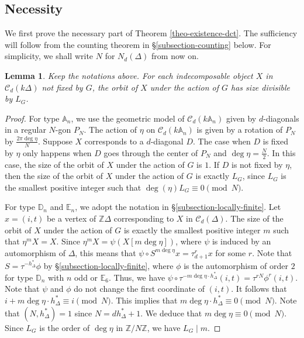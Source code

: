 \documentclass[12pt]{article}
\theoremstyle{plain}
\newtheorem{Lem}[Def]{Lemma}
\theoremstyle{definition}
\begin{document}
\subsection{Necessity}\label{subsection-necessarity}
We first prove the necessary part of Theorem \ref{theo-existence-dct}.  The
sufficiency will follow from the counting theorem in \S\ref{subsection-counting} below.  For simplicity, we shall write $N$ for $N_d(\Delta)$ from now on. 

\begin{Lem}\label{lem-LG1}
Keep the notations above.  For each indecomposable object \(X\) in
\(\mathcal{C}_d(k\Delta)\) not fixed by \(G\), the orbit of \(X\) under the
action of \(G\) has size divisible by \(L_G\). 
\end{Lem}
\begin{proof}
For type $\mathbb{A}_n$, we use the geometric model of
\(\mathcal{C}_d(k\mathbb{A}_n)\) given by \(d\)-diagonals in a regular
\(N\)-gon \(P_N\). The action of \(\eta\) on
\(\mathcal{C}_d(k\mathbb{A}_n)\) is given by a rotation of \(P_N\) by
\(\frac{2\pi\deg\eta}{N}\). Suppose \(X\) corresponds to a \(d\)-diagonal
\(D\).  The case when \(D\) is fixed by \(\eta\) only happens when \(D\) goes
through the center of \(P_N\) and \(\deg\eta=\frac{N}{2}\). In this case, the
size of the orbit of \(X\) under the action of \(G\) is \(1\). If \(D\) is not
fixed by \(\eta\), then the size of the orbit of \(X\) under the action of
\(G\) is exactly \(L_G\), since \(L_G\) is the smallest positive integer such
that \(\deg(\eta)L_G\equiv0\pmod N\).

For type $\mathbb{D}_n$ and $\mathbb{E}_n$, we adopt the notation in \S \ref{subsection-locally-finite}.
Let $x=(i,t)$ be a vertex of $\mathbb{Z}\Delta$ corresponding to $X$ in $\mathcal{C}_d(\Delta)$. The size of the orbit of $X$ under the action of $G$ is exactly the smallest positive integer $m$ such that $\eta^m X = X$. Since $\eta^m X = \psi (X[m\deg\eta])$, where $\psi$ is induced by an automorphism of $\Delta$, this means that $\psi \circ S^{m\deg\eta} x=\tau_{d+1}^r x$ for some $r$. 
Note that  $S=\tau^{-h_{\Delta}^*}\phi$ by \S \ref{subsection-locally-finite}, where $\phi$ is the automorphism of order $2$ for type $\mathbb{D}_n$ with $n$ odd or $\mathbb{E}_6$. Thus, we have 
\(\psi\circ \tau^{-m\deg\eta\cdot h_{\Delta}^*}(i,t)=\tau^{rN}\phi^r(i,t).\)
Note that $\psi$ and $\phi$ do not change the first coordinate of $(i,t)$. It follows that 
\(i+m\deg\eta \cdot h_{\Delta}^* \equiv i \pmod{N}.\)
This implies that $m\deg\eta \cdot h_{\Delta}^* \equiv 0 \pmod{N}$. Note that $(N,h_{\Delta}^*)=1$ since $N=dh_{\Delta}^*+1$. We deduce that $m\deg\eta \equiv 0 \pmod{N}$. Since $L_G$ is the order of $\deg\eta$ in $\mathbb{Z}/N\mathbb{Z}$, we have \(L_G\mid m\).
\end{proof}
\end{document}
